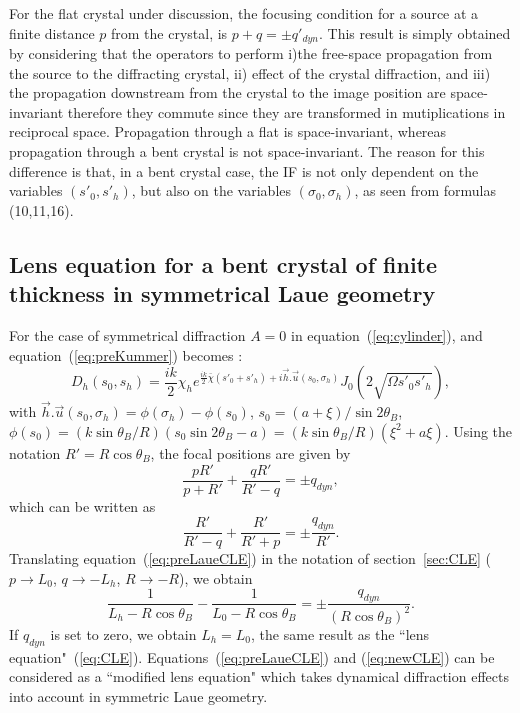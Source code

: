 \documentclass[preprint]{iucr}              %
\newcommand{\inblue}[1]{{\color{blue}#1}}
\newcommand{\inred}[1]{{\color{red}#1}}
\begin{document}
For the flat crystal under discussion, the focusing condition for a source at a finite distance $p$ from the crystal, is $p+q=\pm q'_{dyn}$.\inblue{
This result is simply obtained by considering that the operators to perform i)the free-space propagation from the source to the diffracting crystal, ii) effect of the crystal diffraction, and iii) the propagation downstream from the crystal to the image position are space-invariant therefore they commute since they are transformed in mutiplications in reciprocal space.} Propagation through a flat is space-invariant, whereas propagation through a bent crystal is not space-invariant. The reason for this difference is that, in a bent crystal case, the IF is not only dependent on the variables $(s'_0,s'_h)$, but also on the variables $(\sigma_0,\sigma_h)$,\inred{ as seen from formulas (10,11,16).}



\subsection{Lens equation for a bent crystal of finite thickness in symmetrical Laue geometry}
\label{sec:LaueNewCLE}

For the case of symmetrical diffraction $A=0$ in equation~(\ref{eq:cylinder}), and equation~(\ref{eq:preKummer}) becomes \cite{GuigayFerrero2013}:
\begin{equation}
\label{eq:DhSymmetricalLaue}
    D_h(s_0,s_h) = \frac{i k}{2} \chi_h e^{\frac{i k}{2} \bar \chi (s'_0+s'_h) + i \vec h . \vec u (s_0,\sigma_h)}
    J_0(2\sqrt{\Omega s'_0 s'_h}),
\end{equation}
with $\vec h . \vec u (s_0,\sigma_h) = \phi(\sigma_h)-\phi(s_0) $, $s_0=(a+\xi)/\sin2\theta_B$, $\phi(s_0)=(k \sin\theta_B / R)(s_0 \sin2\theta_B - a)=(k \sin\theta_B / R)(\xi^2+a\xi)$.
Using the notation $R'=R \cos\theta_B$, the focal positions are given by 
\begin{equation}
    \frac{p R'}{p+R'} + \frac{q R'}{R' - q} = \pm q_{dyn},
\end{equation}
which can be written as
\begin{equation}
\label{eq:preLaueCLE}
    \frac{R'}{R'-q} + \frac{R'}{R' + p} = \pm \frac{q_{dyn}}{R'}.
\end{equation}
Translating equation~(\ref{eq:preLaueCLE}) in the notation of section~\ref{sec:CLE} ($p \to L_0$, $q \to -L_h$, $R \to -R$), we obtain
\begin{equation}
\label{eq:newCLE}
    \frac{1}{L_h-R \cos\theta_B} -
    \frac{1}{L_0 - R \cos\theta_B} =
    \pm \frac{q_{dyn}}{(R \cos\theta_B)^2}.
\end{equation}
If $q_{dyn}$ is set to zero, we obtain $L_h=L_0$, the same result as the ``lens equation"~(\ref{eq:CLE}).
Equations~(\ref{eq:preLaueCLE}) and (\ref{eq:newCLE}) can be considered as a ``modified lens equation" which takes dynamical diffraction effects into account in symmetric Laue geometry.
\end{document}
